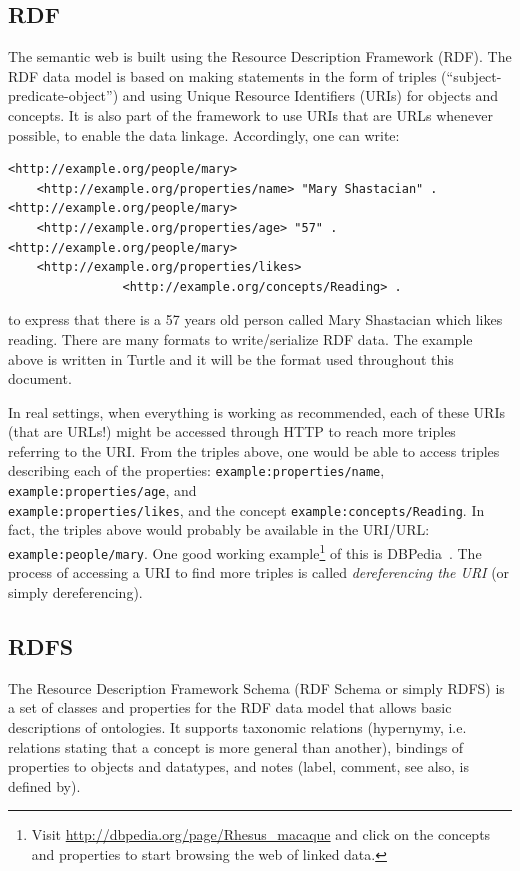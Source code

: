 \documentclass[12pt,fleqn]{article}
\begin{document}
\subsection{RDF}
The semantic web is built using the Resource Description Framework (RDF).
The RDF data model is based on making statements in the form of triples
(``subject-predicate-object'') and using Unique Resource Identifiers (URIs) for
objects and concepts.
It is also part of the framework to use URIs that are URLs whenever possible,
to enable the data linkage.
Accordingly, one can write:

\begin{Verbatim}[fontsize=\footnotesize]
<http://example.org/people/mary>
	<http://example.org/properties/name> "Mary Shastacian" .
<http://example.org/people/mary>
	<http://example.org/properties/age> "57" .
<http://example.org/people/mary> 
	<http://example.org/properties/likes> 
                <http://example.org/concepts/Reading> .
\end{Verbatim}
\noindent to express that there is a 57 years old person called Mary Shastacian which likes reading.
There are many formats to write/serialize RDF data.
The example above is written in Turtle and it will be the format used throughout this document.

In real settings, when everything is working as recommended,
each of these URIs (that are URLs!) might be accessed 
through HTTP to reach more triples referring to the URI.
From the triples above, one would be able to access triples
describing each of the properties: \texttt{example:properties/name}, \texttt{example:properties/age}, and\\
\texttt{example:properties/likes},
and the concept \texttt{example:concepts/Reading}.
In fact, the triples above would probably be available in the URI/URL:
\texttt{example:people/mary}.
One good working example\footnote{Visit \url{http://dbpedia.org/page/Rhesus_macaque}
and click on the concepts and properties to start browsing the web of linked data.}
of this is DBPedia~\citep{dbpedia}.
The process of accessing a URI to find more triples is called \emph{dereferencing the URI} (or simply dereferencing).

\subsection{RDFS}
The Resource Description Framework Schema (RDF Schema or simply RDFS)
is a set of classes and properties for the RDF data model that allows
basic descriptions of ontologies.
It supports taxonomic relations (hypernymy, i.e. relations stating that a concept is more general than another),
bindings of properties to objects and datatypes, and notes (label, comment, see also, is defined by).
\end{document}
